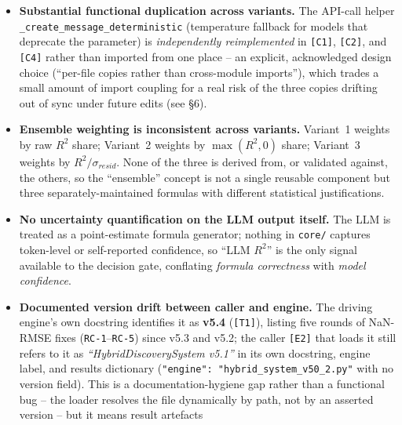 \documentclass[11pt,a4paper]{article}
\newcommand{\code}[1]{\texttt{\small #1}}
\begin{document}
\begin{itemize}
        and \code{execute\_python\_code\_get\_predictions} both call
        Python's \code{exec()} directly on LLM-generated text. Sandboxing
        is limited to a restricted namespace of numpy functions; there is
        no process isolation, resource limiting, or static validation of
        the LLM output before execution.
  \item \textbf{Substantial functional duplication across variants.} The
        API-call helper \code{\_create\_message\_deterministic} (temperature
        fallback for models that deprecate the parameter) is
        \emph{independently reimplemented} in \code{[C1]}, \code{[C2]}, and
        \code{[C4]} rather than imported from one place -- an explicit,
        acknowledged design choice (``per-file copies rather than
        cross-module imports''), which trades a small amount of import
        coupling for a real risk of the three copies drifting out of sync
        under future edits (see \S6).
  \item \textbf{Ensemble weighting is inconsistent across variants.}
        Variant~1 weights by raw $R^2$ share; Variant~2 weights by
        $\max(R^2,0)$ share; Variant~3 weights by $R^2/\sigma_{resid}$.
        None of the three is derived from, or validated against, the
        others, so the ``ensemble'' concept is not a single reusable
        component but three separately-maintained formulas with different
        statistical justifications.
  \item \textbf{No uncertainty quantification on the LLM output itself.}
        The LLM is treated as a point-estimate formula generator; nothing
        in \code{core/} captures token-level or self-reported confidence,
        so ``LLM $R^2$'' is the only signal available to the decision
        gate, conflating \emph{formula correctness} with \emph{model
        confidence}.
  \item \textbf{Documented version drift between caller and engine.} The
        driving engine's own docstring identifies it as
        \textbf{v5.4} (\code{[T1]}), listing five rounds of NaN-RMSE fixes
        (\code{RC-1}--\code{RC-5}) since v5.3 and v5.2; the caller
        \code{[E2]} that loads it still refers to it as
        \emph{``HybridDiscoverySystem v5.1''} in its own docstring, engine
        label, and results dictionary (\code{"engine": "hybrid\_system\_v50\_2.py"}
        with no version field). This is a documentation-hygiene gap rather
        than a functional bug -- the loader resolves the file dynamically by
        path, not by an asserted version -- but it means result artefacts

\end{itemize}
\end{document}
